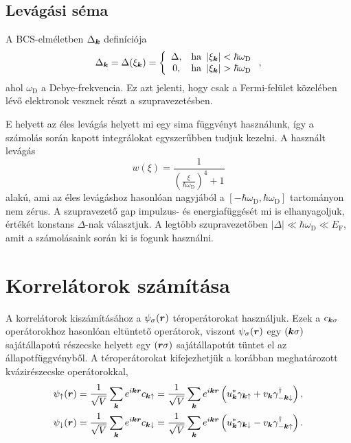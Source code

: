 \documentclass[a4paper,12pt,titlepage]{article}
\newcommand{\KK}{{\vb*{k}}}
\newcommand{\RR}{{\vb*{r}}}
\newcommand{\EF}{{E_\text{F}}}
\begin{document}
\subsection{Levágási séma}

A BCS-elméletben $\Delta_\KK$ definíciója
\begin{equation}
	\Delta_\KK = \Delta(\xi_\KK) = \left\{ \begin{array}{cl} \Delta, & \text{ha } \left| \xi_\KK \right| < \hbar \omega_\text{D} \\ 0, & \text{ha } \left| \xi_\KK \right| > \hbar \omega_\text{D} \end{array} \right. ,
\end{equation}
ahol $\omega_\text{D}$ a Debye-frekvencia.  Ez azt jelenti, hogy csak a Fermi-felület közelében lévő elektronok vesznek részt a szupravezetésben.

E helyett az éles levágás helyett mi egy sima függvényt használunk, így a számolás során kapott integrálokat egyszerűbben tudjuk kezelni.  A használt levágás
\begin{equation} \label{cutoff}
	w(\xi) = \frac{1}{\left( \frac{\xi}{\hbar \omega_\text{D}} \right)^4 + 1}
\end{equation}
alakú, ami az éles levágáshoz hasonlóan nagyjából a $\left[ -\hbar \omega_\text{D}, \hbar \omega_\text{D} \right]$ tartományon nem zérus. A szupravezető gap impulzus- és energiafüggését mi is elhanyagoljuk, értékét konstans $\Delta$-nak választjuk.  A legtöbb szupravezetőben $\left|\Delta\right| \ll \hbar \omega_\text{D} \ll \EF$, amit a számolásaink során ki is fogunk használni.



\section{Korrelátorok számítása}

A korrelátorok kiszámításához a $\psi_\sigma(\RR)$ téroperátorokat használjuk.  Ezek a $c_{\KK \sigma}$ operátorokhoz hasonlóan eltüntető operátorok, viszont $\psi_\sigma(\RR)$ egy $\left( \KK \sigma \right)$ sajátállapotú részecske helyett egy $\left( \RR \sigma \right)$ sajátállapotút tüntet el az állapotfüggvényből.  A téroperátorokat kifejezhetjük a korábban meghatározott kvázirészecske operátorokkal,
\begin{equation} \label{psi}
\begin{split}
	\psi_\uparrow(\RR) & = \frac{1}{\sqrt{V}} \sum\limits_\KK e^{i \KK \RR} c_{\KK \uparrow} = \frac{1}{\sqrt{V}} \sum\limits_\KK e^{i \KK \RR} \left( u_\KK^* \gamma_{\KK \uparrow} + v_\KK \gamma_{-\KK \downarrow}^\dagger \right), \\
	\psi_\downarrow(\RR) & = \frac{1}{\sqrt{V}} \sum\limits_\KK e^{i \KK \RR} c_{\KK \downarrow} = \frac{1}{\sqrt{V}} \sum\limits_\KK e^{i \KK \RR} \left( u_\KK^* \gamma_{\KK \downarrow} - v_\KK \gamma_{-\KK \uparrow}^\dagger \right).
\end{split}
\end{equation}
\end{document}
